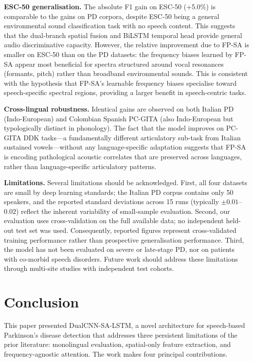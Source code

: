 \documentclass[conference]{IEEEtran}
\begin{document}
\textbf{ESC-50 generalisation.} The absolute F1 gain on ESC-50 (+5.0\%) is comparable to the gains on PD corpora, despite ESC-50 being a general environmental sound classification task with no speech content. This suggests that the dual-branch spatial fusion and BiLSTM temporal head provide general audio discriminative capacity. However, the relative improvement due to FP-SA is smaller on ESC-50 than on the PD datasets: the frequency biases learned by FP-SA appear most beneficial for spectra structured around vocal resonances (formants, pitch) rather than broadband environmental sounds. This is consistent with the hypothesis that FP-SA's learnable frequency biases specialise toward speech-specific spectral regions, providing a larger benefit in speech-centric tasks.

\textbf{Cross-lingual robustness.} Identical gains are observed on both Italian PD (Indo-European) and Colombian Spanish PC-GITA (also Indo-European but typologically distinct in phonology). The fact that the model improves on PC-GITA DDK tasks---a fundamentally different articulatory sub-task from Italian sustained vowels---without any language-specific adaptation suggests that FP-SA is encoding pathological acoustic correlates that are preserved across languages, rather than language-specific articulatory patterns.

\textbf{Limitations.} Several limitations should be acknowledged. First, all four datasets are small by deep learning standards; the Italian PD corpus contains only 50 speakers, and the reported standard deviations across 15 runs (typically $\pm 0.01$--$0.02$) reflect the inherent variability of small-sample evaluation. Second, our evaluation uses cross-validation on the full available data; no independent held-out test set was used. Consequently, reported figures represent cross-validated training performance rather than prospective generalisation performance. Third, the model has not been evaluated on severe or late-stage PD, nor on patients with co-morbid speech disorders. Future work should address these limitations through multi-site studies with independent test cohorts.


\section{Conclusion}

This paper presented DualCNN-SA-LSTM, a novel architecture for speech-based Parkinson's disease detection that addresses three persistent limitations of the prior literature: monolingual evaluation, spatial-only feature extraction, and frequency-agnostic attention. The work makes four principal contributions.
\end{document}

